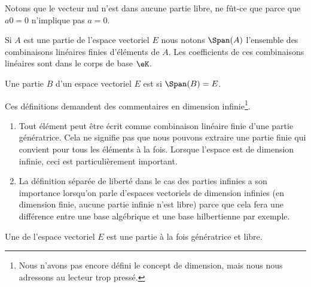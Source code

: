 \begin{remark}
    Notons que le vecteur nul n'est dans aucune partie libre, ne fût-ce que parce que \( a0=0\) n'implique pas \( a=0\).
\end{remark}

Si \( A\) est une partie de l'espace vectoriel \( E\) nous notons \( \Span(A)\) l'ensemble des combinaisons linéaires finies d'éléments de \( A\). Les coefficients de ces combinaisons linéaires sont dans le corps de base \( \eK\).

\begin{definition}
    Une partie $B$ d'un espace vectoriel \( E\) est  si \( \Span(B)=E\).
\end{definition}

\begin{remark}
    Ces définitions demandent des commentaires en dimension infinie\footnote{Nous n'avons pas encore défini le concept de dimension, mais nous nous adressons au lecteur trop pressé.}.

    \begin{enumerate}
        \item
    Tout élément peut être écrit comme combinaison linéaire finie d'une partie génératrice. Cela ne signifie pas que nous pouvons extraire une partie finie qui convient pour tous les éléments à la fois. Lorsque l'espace est de dimension infinie, ceci est particulièrement important.
\item
    La définition séparée de liberté dans le cas des parties infinies a son importance lorsqu'on parle d'espaces vectoriels de dimension infinies (en dimension finie, aucune partie infinie n'est libre) parce que cela fera une différence entre une base algébrique et une base hilbertienne par exemple.
    \end{enumerate}
\end{remark}

\begin{definition}[Base]        \label{DEFooNGDSooEDAwTh}
    Une  de l'espace vectoriel \( E\) est une partie à la fois génératrice et libre.
\end{definition}

